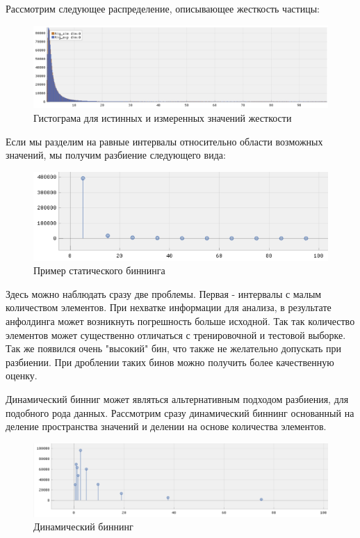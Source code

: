 \documentclass[a4paper,12pt]{diplom}
\begin{document}
Рассмотрим следующее распределение, описывающее жесткость частицы:

\begin{figure}[h!]
   \centering
   \includegraphics[width=\linewidth]{images/rig_dist.png}
   \caption{Гистограма для истинных и измеренных значений жесткости}
   \label{photo:rig_dist}
\end{figure}

Если мы разделим на равные интервалы относительно области возможных значений, мы получим разбиение следующего вида:

\clearpage

\begin{figure}[h!]
   \centering
   \includegraphics[width=\linewidth]{images/rig_static_binning.png}
   \caption{Пример статического биннинга}
   \label{fig:coffee}
\end{figure}

Здесь можно наблюдать сразу две проблемы. Первая - интервалы с малым количеством элементов. При нехватке информации для анализа, в результате
анфолдинга может возникнуть погрешность больше исходной. Так так количество элементов может существенно отличаться с тренировочной и тестовой 
выборке. Так же появился очень "высокий" бин, что также не желательно допускать при разбиении. При дроблении таких бинов можно получить более 
качественную оценку.

Динамический бинниг может являться альтернативным подходом разбиения, для подобного рода данных. Рассмотрим сразу динамический биннинг 
основанный на деление пространства значений и делении на основе количества элементов.

 \begin{figure}[h!]
   \centering
   \includegraphics[width=\linewidth]{images/rig_dynamic_binning.png}
   \caption{Динамический биннинг}
 \end{figure}
\end{document}
